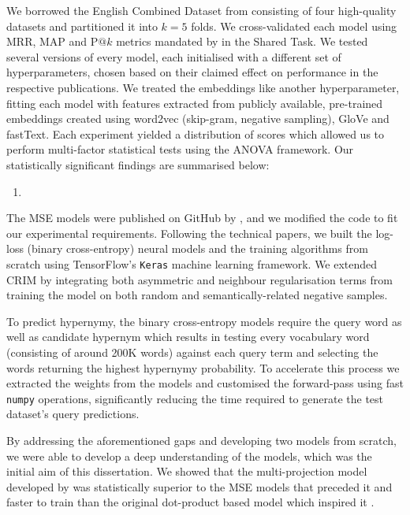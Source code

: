 \begin{table*}\centering
\begin{tabular}{@{}llll@{}}\toprule
\bottomrule
\end{tabular}
\caption{}\label{tab:conc_experiment_summary}
\end{table*}

We borrowed the English Combined Dataset from \citet{ustalov2017negative} consisting of four high-quality datasets and partitioned it into $k=5$ folds.  We cross-validated each model using \ac{MRR}, \ac{MAP} and P$@k$ metrics mandated by \citet{camacho2018semeval} in the Shared Task.  We tested several versions of every model, each initialised with a different set of hyperparameters, chosen based on their claimed effect on performance in the respective publications.  We treated the embeddings like another hyperparameter, fitting each model with features extracted from publicly available, pre-trained embeddings created using word2vec (skip-gram, negative sampling), GloVe and fastText.  Each experiment yielded a distribution of scores which allowed us to perform multi-factor statistical tests using the \ac{ANOVA} framework.  Our statistically significant findings are summarised below:
\begin{enumerate}
    \item 
\end{enumerate}

The \ac{MSE} models were published on GitHub by \citeauthor{ustalov2017negative}, and we modified the code to fit our experimental requirements.  Following the technical papers, we built the log-loss (binary cross-entropy) neural models and the training algorithms from scratch using TensorFlow's \texttt{Keras} machine learning framework.  We extended CRIM by integrating both asymmetric and neighbour regularisation terms from \citet{ustalov2017negative} training the model on both random and semantically-related negative samples. 

To predict hypernymy, the binary cross-entropy models require the query word as well as candidate hypernym which results in testing every vocabulary word (consisting of around 200K words) against each query term and selecting the words returning the highest hypernymy probability.  To accelerate this process we extracted the weights from the models and customised the forward-pass using fast \texttt{numpy} operations, significantly reducing the time required to generate the test dataset's query predictions.  

By addressing the aforementioned gaps and developing two models from scratch, we were able to develop a deep understanding of the models, which was the initial aim of this dissertation.  We showed that the multi-projection model developed by \citet{bernier2018crim} was statistically superior to the \ac{MSE} models that preceded it and faster to train than the original dot-product based model which inspired it \citep{yamane2016distributional}.  

